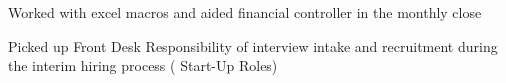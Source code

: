 \begin{cventries}
{\begin{cvitems}
        \item{Worked with excel macros and aided financial controller in the monthly close}
        \item{Picked up Front Desk Responsibility of interview intake and recruitment during the interim hiring process ( Start-Up Roles)}
      \end{cvitems}
    }    
\end{cventries}
